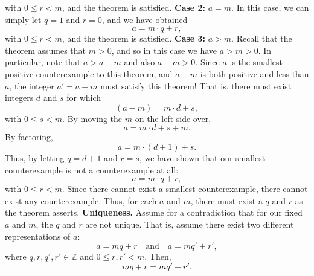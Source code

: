 \documentclass{report}
\begin{document}
\begin{itemize}
\[            \]
            with $0 \leq r < m$, and the theorem is satisfied.
            \bigbreak \noindent 
            \textbf{Case 2:} $a = m$. In this case, we can simply let $q = 1$ and $r = 0$, and we have obtained
            \[
                a = m \cdot q + r,
            \]
            with $0 \leq r < m$, and the theorem is satisfied.
            \bigbreak \noindent 
            \textbf{Case 3:} $a > m$. Recall that the theorem assumes that $m > 0$, and so in this case we have $a > m > 0$. In particular, note that $a > a - m$ and also $a - m > 0$.
            \bigbreak \noindent 
            Since $a$ is the smallest positive counterexample to this theorem, and $a - m$ is both positive and less than $a$, the integer $a' = a - m$ must satisfy this theorem! That is, there must exist integers $d$ and $s$ for which
            \[
                (a - m) = m \cdot d + s,
            \]
            with $0 \leq s < m$. By moving the $m$ on the left side over,
            \[
                a = m \cdot d + s + m.
            \]
            By factoring,
            \[
                a = m \cdot (d + 1) + s.
            \]
            Thus, by letting $q = d + 1$ and $r = s$, we have shown that our smallest counterexample is not a counterexample at all:
            \[
                a = m \cdot q + r,
            \]
            with $0 \leq r < m$. Since there cannot exist a smallest counterexample, there cannot exist any counterexample. Thus, for each $a$ and $m$, there must exist a $q$ and $r$ as the theorem asserts.
            \bigbreak \noindent 
            \textbf{Uniqueness.} Assume for a contradiction that for our fixed $a$ and $m$, the $q$ and $r$ are not unique. That is, assume there exist two different representations of $a$:
            \[
                a = mq + r \quad \text{and} \quad a = mq' + r',
            \]
            where $q, r, q', r' \in \mathbb{Z}$ and $0 \leq r, r' < m$. Then,
            \[
                mq + r = mq' + r'.
            \]


\end{itemize}
\end{document}
